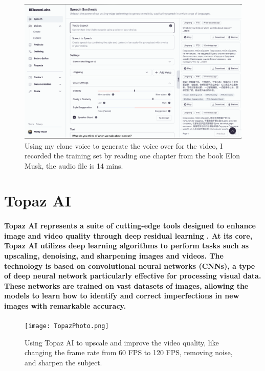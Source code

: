 \documentclass[11pt,a4paper,oneside]{report}
\begin{document}
\begin{figure}[htbp]
  \centering
  \includegraphics[width=\textwidth]{ElevenLabs.png}
  \caption{Using my clone voice to generate the voice over for the video, I recorded the training set by reading one chapter from the book Elon Musk, the audio file is 14 mins.}
\end{figure}

\section{Topaz AI}
\paragraph{Topaz AI represents a suite of cutting-edge tools designed to enhance image and video quality through deep residual learning \cite{he2016deep}. At its core, Topaz AI utilizes deep learning algorithms to perform tasks such as upscaling, denoising, and sharpening images and videos. The technology is based on convolutional neural networks (CNNs), a type of deep neural network particularly effective for processing visual data. These networks are trained on vast datasets of images, allowing the models to learn how to identify and correct imperfections in new images with remarkable accuracy.}

\begin{figure}[htbp]
  \centering
  \texttt{[image: TopazPhoto.png]}
  \caption{Using Topaz AI to upscale and improve the video quality, like changing the frame rate from 60 FPS to 120 FPS, removing noise, and sharpen the subject.}
\end{figure}

\end{document}
